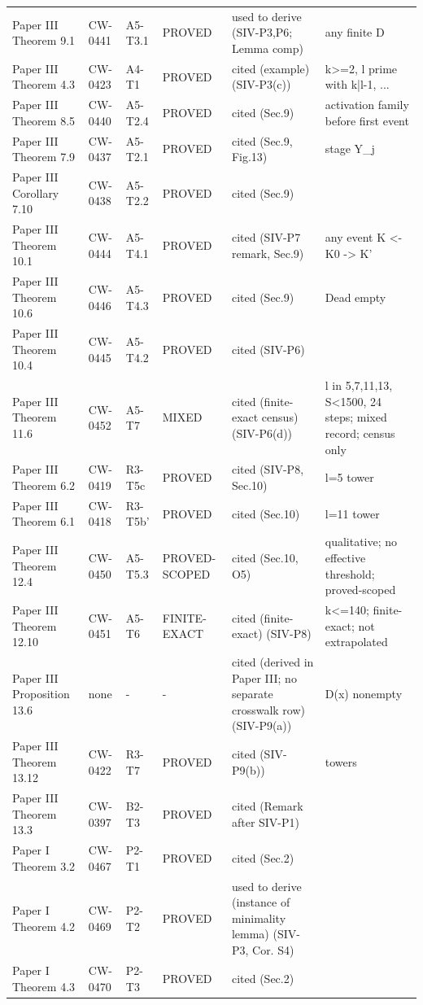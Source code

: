 {\begin{longtable}{@{}p{2.9cm}p{1.5cm}p{1.2cm}p{3.1cm}p{3.1cm}p{2.2cm}@{}}
Paper III Theorem 9.1 & CW-0441 & A5-T3.1 & PROVED & used to derive (SIV-P3,P6; Lemma comp) & any finite D\\
Paper III Theorem 4.3 & CW-0423 & A4-T1 & PROVED & cited (example) (SIV-P3(c)) & k>=2, l prime with k|l-1, ...\\
Paper III Theorem 8.5 & CW-0440 & A5-T2.4 & PROVED & cited (Sec.9) & activation family before first event\\
Paper III Theorem 7.9 & CW-0437 & A5-T2.1 & PROVED & cited (Sec.9, Fig.13) & stage Y\_j\\
Paper III Corollary 7.10 & CW-0438 & A5-T2.2 & PROVED & cited (Sec.9) & \\
Paper III Theorem 10.1 & CW-0444 & A5-T4.1 & PROVED & cited (SIV-P7 remark, Sec.9) & any event K <- K0 -> K'\\
Paper III Theorem 10.6 & CW-0446 & A5-T4.3 & PROVED & cited (Sec.9) & Dead empty\\
Paper III Theorem 10.4 & CW-0445 & A5-T4.2 & PROVED & cited (SIV-P6) & \\
Paper III Theorem 11.6 & CW-0452 & A5-T7 & MIXED & cited (finite-exact census) (SIV-P6(d)) & l in {5,7,11,13}, S<1500, 24 steps; mixed record; census only\\
Paper III Theorem 6.2 & CW-0419 & R3-T5c & PROVED & cited (SIV-P8, Sec.10) & l=5 tower\\
Paper III Theorem 6.1 & CW-0418 & R3-T5b' & PROVED & cited (Sec.10) & l=11 tower\\
Paper III Theorem 12.4 & CW-0450 & A5-T5.3 & PROVED-SCOPED & cited (Sec.10, O5) & qualitative; no effective threshold; proved-scoped\\
Paper III Theorem 12.10 & CW-0451 & A5-T6 & FINITE-EXACT & cited (finite-exact) (SIV-P8) & k<=140; finite-exact; not extrapolated\\
Paper III Proposition 13.6 & none & - & - & cited (derived in Paper III; no separate crosswalk row) (SIV-P9(a)) & D(x) nonempty\\
Paper III Theorem 13.12 & CW-0422 & R3-T7 & PROVED & cited (SIV-P9(b)) & towers\\
Paper III Theorem 13.3 & CW-0397 & B2-T3 & PROVED & cited (Remark after SIV-P1) & \\
Paper I Theorem 3.2 & CW-0467 & P2-T1 & PROVED & cited (Sec.2) & \\
Paper I Theorem 4.2 & CW-0469 & P2-T2 & PROVED & used to derive (instance of minimality lemma) (SIV-P3, Cor. S4) & \\
Paper I Theorem 4.3 & CW-0470 & P2-T3 & PROVED & cited (Sec.2) & \\

\end{longtable}}
